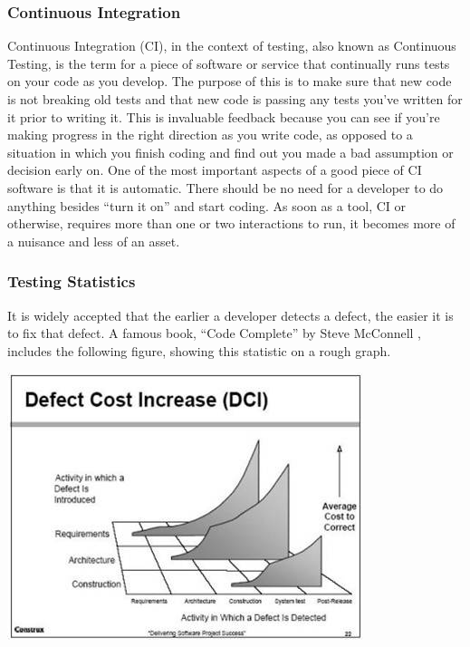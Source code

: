 \documentclass[11pt]{article}
\newenvironment{Figure}
  {\par\medskip\noindent\minipage{\linewidth}}
  {\endminipage\par\medskip}
\begin{document}
\subsubsection{Continuous Integration}
Continuous Integration (CI), in the context of testing, also known as Continuous Testing, is the term for a piece of software or service that continually runs tests on your code as you develop. The purpose of this is to make sure that new code is not breaking old tests and that new code is passing any tests you've written for it prior to writing it. This is invaluable feedback because you can see if you're making progress in the right direction as you write code, as opposed to a situation in which you finish coding and find out you made a bad assumption or decision early on. 
One of the most important aspects of a good piece of CI software is that it is automatic. There should be no need for a developer to do anything besides ``turn it on'' and start coding. As soon as a tool, CI or otherwise, requires more than one or two interactions to run, it becomes more of a nuisance and less of an asset.

\subsubsection{Testing Statistics}
It is widely accepted that the earlier a developer detects a defect, the easier it is to fix that defect. A famous book, ``Code Complete'' by Steve McConnell \cite{DefectPic}, includes the following figure, showing this statistic on a rough graph.

\begin{Figure}
	\centering
	\includegraphics[width=0.8\linewidth]{defectcost.jpg} 
\end{Figure}
\end{document}
